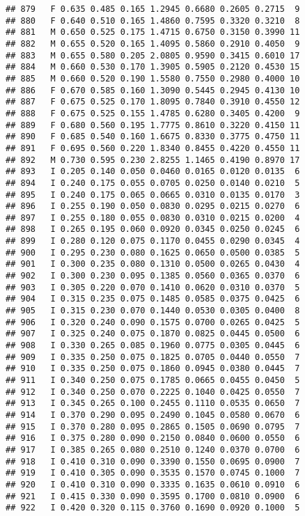 \documentclass[
]{article}
\begin{document}
\begin{verbatim}
## 879   F 0.635 0.485 0.165 1.2945 0.6680 0.2605 0.2715  9
## 880   F 0.640 0.510 0.165 1.4860 0.7595 0.3320 0.3210  8
## 881   M 0.650 0.525 0.175 1.4715 0.6750 0.3150 0.3990 11
## 882   M 0.655 0.520 0.165 1.4095 0.5860 0.2910 0.4050  9
## 883   M 0.655 0.580 0.205 2.0805 0.9590 0.3415 0.6010 17
## 884   M 0.660 0.530 0.170 1.3905 0.5905 0.2120 0.4530 15
## 885   M 0.660 0.520 0.190 1.5580 0.7550 0.2980 0.4000 10
## 886   F 0.670 0.585 0.160 1.3090 0.5445 0.2945 0.4130 10
## 887   F 0.675 0.525 0.170 1.8095 0.7840 0.3910 0.4550 12
## 888   F 0.675 0.525 0.155 1.4785 0.6280 0.3405 0.4200  9
## 889   F 0.680 0.560 0.195 1.7775 0.8610 0.3220 0.4150 11
## 890   F 0.685 0.540 0.160 1.6675 0.8330 0.3775 0.4750 11
## 891   F 0.695 0.560 0.220 1.8340 0.8455 0.4220 0.4550 11
## 892   M 0.730 0.595 0.230 2.8255 1.1465 0.4190 0.8970 17
## 893   I 0.205 0.140 0.050 0.0460 0.0165 0.0120 0.0135  6
## 894   I 0.240 0.175 0.055 0.0705 0.0250 0.0140 0.0210  5
## 895   I 0.240 0.175 0.065 0.0665 0.0310 0.0135 0.0170  3
## 896   I 0.255 0.190 0.050 0.0830 0.0295 0.0215 0.0270  6
## 897   I 0.255 0.180 0.055 0.0830 0.0310 0.0215 0.0200  4
## 898   I 0.265 0.195 0.060 0.0920 0.0345 0.0250 0.0245  6
## 899   I 0.280 0.120 0.075 0.1170 0.0455 0.0290 0.0345  4
## 900   I 0.295 0.230 0.080 0.1625 0.0650 0.0500 0.0385  5
## 901   I 0.300 0.235 0.080 0.1310 0.0500 0.0265 0.0430  4
## 902   I 0.300 0.230 0.095 0.1385 0.0560 0.0365 0.0370  6
## 903   I 0.305 0.220 0.070 0.1410 0.0620 0.0310 0.0370  5
## 904   I 0.315 0.235 0.075 0.1485 0.0585 0.0375 0.0425  6
## 905   I 0.315 0.230 0.070 0.1440 0.0530 0.0305 0.0400  8
## 906   I 0.320 0.240 0.090 0.1575 0.0700 0.0265 0.0425  5
## 907   I 0.325 0.240 0.075 0.1870 0.0825 0.0445 0.0500  6
## 908   I 0.330 0.265 0.085 0.1960 0.0775 0.0305 0.0445  6
## 909   I 0.335 0.250 0.075 0.1825 0.0705 0.0440 0.0550  7
## 910   I 0.335 0.250 0.075 0.1860 0.0945 0.0380 0.0445  7
## 911   I 0.340 0.250 0.075 0.1785 0.0665 0.0455 0.0450  5
## 912   I 0.340 0.250 0.070 0.2225 0.1040 0.0425 0.0550  7
## 913   I 0.345 0.265 0.100 0.2455 0.1110 0.0535 0.0650  7
## 914   I 0.370 0.290 0.095 0.2490 0.1045 0.0580 0.0670  6
## 915   I 0.370 0.280 0.095 0.2865 0.1505 0.0690 0.0795  7
## 916   I 0.375 0.280 0.090 0.2150 0.0840 0.0600 0.0550  6
## 917   I 0.385 0.265 0.080 0.2510 0.1240 0.0370 0.0700  6
## 918   I 0.410 0.310 0.090 0.3390 0.1550 0.0695 0.0900  7
## 919   I 0.410 0.305 0.090 0.3535 0.1570 0.0745 0.1000  7
## 920   I 0.410 0.310 0.090 0.3335 0.1635 0.0610 0.0910  6
## 921   I 0.415 0.330 0.090 0.3595 0.1700 0.0810 0.0900  6
## 922   I 0.420 0.320 0.115 0.3760 0.1690 0.0920 0.1000  5

\end{verbatim}
\end{document}
